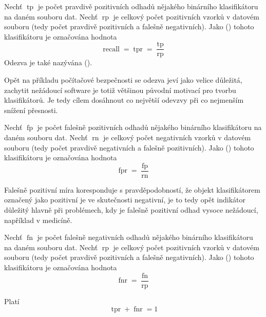 \begin{define}
	Nechť \( \operatorname{tp} \) je počet pravdivě pozitivních odhadů nějakého binárního klasifikátoru na daném souboru dat. Nechť \( \operatorname{rp} \) je celkový počet pozitivních vzorků v datovém souboru (tedy počet pravdivě pozitivních a falešně negativních). Jako  () tohoto klasifikátoru je označována hodnota
	\[ \operatorname{recall} = \operatorname{tpr} = \frac{\operatorname{tp}}{\operatorname{rp}} \]
	Odezva je také nazývána  ().
\end{define}

Opět na příkladu počítačové bezpečnosti se odezva jeví jako velice důležitá, zachytit nežádoucí software je totiž většinou původní motivací pro tvorbu klasifikátorů. Je tedy cílem dosáhnout co největší odevzvy při co nejmenším snížení přesnosti.

\begin{define}
	Nechť \( \operatorname{fp} \) je počet falešně pozitivních odhadů nějakého binárního klasifikátoru na daném souboru dat. Nechť \( \operatorname{rn} \) je celkový počet negativních vzorků v datovém souboru (tedy počet pravdivě negativních a falešně pozitivních). Jako  () tohoto klasifikátoru je označována hodnota
	\[ \operatorname{fpr} = \frac{\operatorname{fp}}{\operatorname{rn}} \]
\end{define}

Falešně pozitivní míra koresponduje s pravděpodobností, že objekt klasifikátorem označený jako pozitivní je ve skutečnosti negativní, je to tedy opět indikátor důležitý hlavně při problémech, kdy je falešně pozitivní odhad vysoce nežádoucí, například v medicíně. 

\begin{define}
	Nechť \( \operatorname{fn} \) je počet falešně negativních odhadů nějakého binárního klasifikátoru na daném souboru dat. Nechť \( \operatorname{rp} \) je celkový počet pozitivních vzorků v datovém souboru (tedy počet pravdivě pozitivních a falešně negativních). Jako  () tohoto klasifikátoru je označována hodnota
	\[ \operatorname{fnr} = \frac{\operatorname{fn}}{\operatorname{rp}} \]
\end{define}

\begin{theorem}\label{tpr+fnr}
	Platí
	\[ \operatorname{tpr} + \operatorname{fnr} = 1 \]
\end{theorem}

